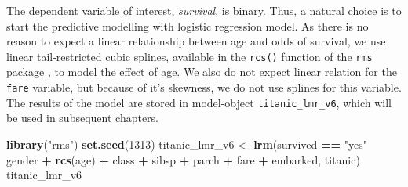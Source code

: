 \documentclass[]{krantz}
\newenvironment{Shaded}{\begin{snugshade}}{\end{snugshade}}
\newcommand{\DecValTok}[1]{\textcolor[rgb]{0.00,0.00,0.81}{#1}}
\newcommand{\KeywordTok}[1]{\textcolor[rgb]{0.13,0.29,0.53}{\textbf{#1}}}
\newcommand{\NormalTok}[1]{#1}
\newcommand{\OperatorTok}[1]{\textcolor[rgb]{0.81,0.36,0.00}{\textbf{#1}}}
\newcommand{\StringTok}[1]{\textcolor[rgb]{0.31,0.60,0.02}{#1}}
\begin{document}
The dependent variable of interest, \emph{survival}, is binary. Thus, a natural choice is to start the predictive modelling with logistic regression model. As there is no reason to expect a linear relationship between age and odds of survival, we use linear tail-restricted cubic splines, available in the \texttt{rcs()} function of the \texttt{rms} package \citep{rms}, to model the effect of age. We also do not expect linear relation for the \texttt{fare} variable, but because of it's skewness, we do not use splines for this variable. The results of the model are stored in model-object \texttt{titanic\_lmr\_v6}, which will be used in subsequent chapters.

\begin{Shaded}
\begin{Highlighting}[]
\KeywordTok{library}\NormalTok{(}\StringTok{"rms"}\NormalTok{)}
\KeywordTok{set.seed}\NormalTok{(}\DecValTok{1313}\NormalTok{)}
\NormalTok{titanic_lmr_v6 <-}\StringTok{ }\KeywordTok{lrm}\NormalTok{(survived }\OperatorTok{==}\StringTok{ "yes"} \OperatorTok{~}\StringTok{ }\NormalTok{gender }\OperatorTok{+}\StringTok{ }\KeywordTok{rcs}\NormalTok{(age) }\OperatorTok{+}\StringTok{ }\NormalTok{class }\OperatorTok{+}
\StringTok{         }\NormalTok{sibsp }\OperatorTok{+}\StringTok{ }\NormalTok{parch }\OperatorTok{+}\StringTok{ }\NormalTok{fare }\OperatorTok{+}\StringTok{ }\NormalTok{embarked, titanic)}
\NormalTok{titanic_lmr_v6}
\end{Highlighting}
\end{Shaded}
\end{document}
